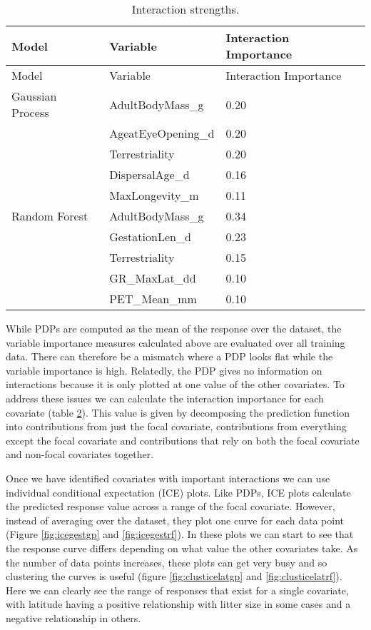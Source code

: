 \documentclass[10pt,]{article}
\begin{document}
\begin{table}[t!]
\begin{longtable}[c]{@{}lll@{}}
\caption{Interaction strengths. \label{tbl:interimp}}\tabularnewline
\toprule
Model & Variable & Interaction Importance\tabularnewline
\midrule
\endfirsthead
\toprule
Model & Variable & Interaction Importance\tabularnewline
\midrule
\endhead
Gaussian Process & AdultBodyMass\_g & 0.20\tabularnewline
& AgeatEyeOpening\_d & 0.20\tabularnewline
& Terrestriality & 0.20\tabularnewline
& DispersalAge\_d & 0.16\tabularnewline
& MaxLongevity\_m & 0.11\tabularnewline
Random Forest & AdultBodyMass\_g & 0.34\tabularnewline
& GestationLen\_d & 0.23\tabularnewline
& Terrestriality & 0.15\tabularnewline
& GR\_MaxLat\_dd & 0.10\tabularnewline
& PET\_Mean\_mm & 0.10\tabularnewline
\bottomrule
\end{longtable}
\end{table}



While PDPs are computed as the mean of the response over the dataset, the variable importance measures calculated above are evaluated over all training data.
There can therefore be a mismatch where a PDP looks flat while the variable importance is high.
Relatedly, the PDP gives no information on interactions because it is only plotted at one value of the other covariates.
To address these issues we can calculate the interaction importance for each covariate (table \ref{tbl:interimp}).
This value is given by decomposing the prediction function into contributions from just the focal covariate, contributions from everything except the focal covariate and contributions that rely on both the focal covariate and non-focal covariates together.


Once we have identified covariates with important interactions we can use individual conditional expectation (ICE) plots.
Like PDPs, ICE plots calculate the predicted response value across a range of the focal covariate.
However, instead of averaging over the dataset, they plot one curve for each data point (Figure \ref{fig:icegestgp} and \ref{fig:icegestrf}).
In these plots we can start to see that the response curve differs depending on what value the other covariates take.
As the number of data points increases, these plots can get very busy and so clustering the curves is useful (figure \ref{fig:clusticelatgp} and \ref{fig:clusticelatrf}).
Here we can clearly see the range of responses that exist for a single covariate, with latitude having a positive relationship with litter size in some cases and a negative relationship in others.
\end{document}
